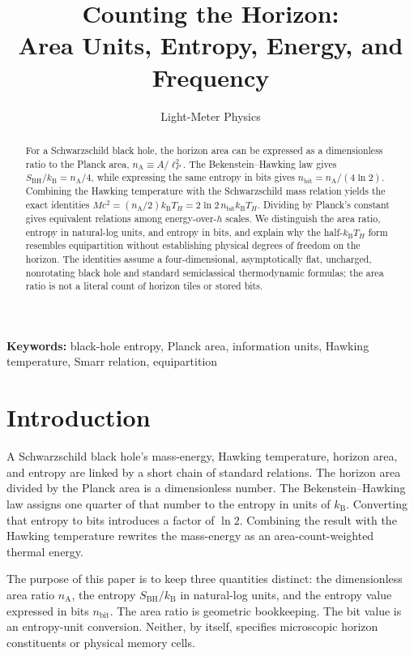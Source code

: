 \documentclass[12pt]{article}
\title{Counting the Horizon:\\
Area Units, Entropy, Energy, and Frequency}
\author{Light-Meter Physics}
\date{}
\begin{document}
\maketitle

\begin{abstract}
For a Schwarzschild black hole, the horizon area can be expressed as a dimensionless ratio to the Planck area, $n_{\mathrm A}\equiv A/\ell_P^2$. The Bekenstein--Hawking law gives $S_{\mathrm{BH}}/k_{\mathrm B}=n_{\mathrm A}/4$, while expressing the same entropy in bits gives $n_{\mathrm{bit}}=n_{\mathrm A}/(4\ln2)$. Combining the Hawking temperature with the Schwarzschild mass relation yields the exact identities $Mc^2=(n_{\mathrm A}/2)k_{\mathrm B}T_H=2\ln2\,n_{\mathrm{bit}}k_{\mathrm B}T_H$. Dividing by Planck's constant gives equivalent relations among energy-over-$h$ scales. We distinguish the area ratio, entropy in natural-log units, and entropy in bits, and explain why the half-$k_{\mathrm B}T_H$ form resembles equipartition without establishing physical degrees of freedom on the horizon. The identities assume a four-dimensional, asymptotically flat, uncharged, nonrotating black hole and standard semiclassical thermodynamic formulas; the area ratio is not a literal count of horizon tiles or stored bits.
\end{abstract}

\noindent\textbf{Keywords:} black-hole entropy, Planck area, information units, Hawking temperature, Smarr relation, equipartition

\section{Introduction}

A Schwarzschild black hole's mass-energy, Hawking temperature, horizon area, and entropy are linked by a short chain of standard relations. The horizon area divided by the Planck area is a dimensionless number. The Bekenstein--Hawking law assigns one quarter of that number to the entropy in units of $k_{\mathrm B}$. Converting that entropy to bits introduces a factor of $\ln2$. Combining the result with the Hawking temperature rewrites the mass-energy as an area-count-weighted thermal energy.

The purpose of this paper is to keep three quantities distinct: the dimensionless area ratio $n_{\mathrm A}$, the entropy $S_{\mathrm{BH}}/k_{\mathrm B}$ in natural-log units, and the entropy value expressed in bits $n_{\mathrm{bit}}$. The area ratio is geometric bookkeeping. The bit value is an entropy-unit conversion. Neither, by itself, specifies microscopic horizon constituents or physical memory cells.
\end{document}
